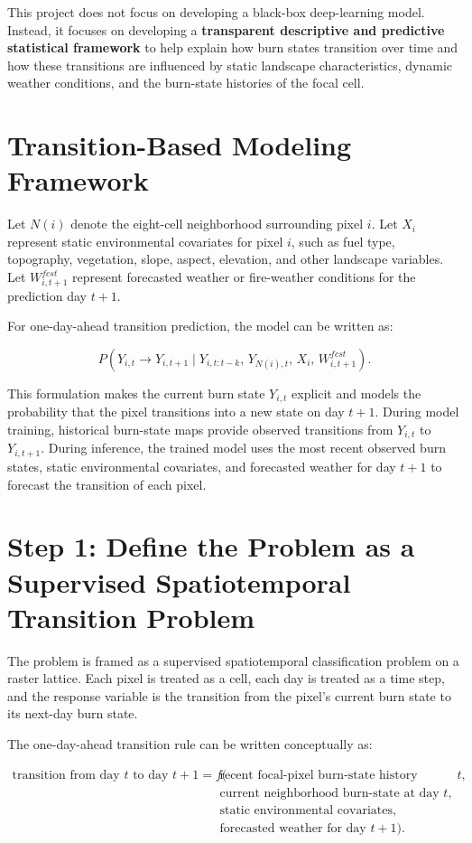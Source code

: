\documentclass[11pt]{article}
\begin{document}
This project does not focus on developing a black-box deep-learning model. Instead, it focuses on developing a \textbf{transparent descriptive and predictive statistical framework} to help explain how burn states transition over time and how these transitions are influenced by static landscape characteristics, dynamic weather conditions, and the burn-state histories of the focal cell.

\section{Transition-Based Modeling Framework}

Let $N(i)$ denote the eight-cell neighborhood surrounding pixel $i$. Let $X_i$ represent static environmental covariates for pixel $i$, such as fuel type, topography, vegetation, slope, aspect, elevation, and other landscape variables. Let $W^{fcst}_{i,t+1}$ represent forecasted weather or fire-weather conditions for the prediction day $t+1$.

For one-day-ahead transition prediction, the model can be written as:

\[
P\left(
Y_{i,t} \rightarrow Y_{i,t+1}
\mid
Y_{i,t:t-k},\,
Y_{N(i),t},\,
X_i,\,
W^{fcst}_{i,t+1}
\right).
\]

This formulation makes the current burn state $Y_{i,t}$ explicit and models the probability that the pixel transitions into a new state on day $t+1$. During model training, historical burn-state maps provide observed transitions from $Y_{i,t}$ to $Y_{i,t+1}$. During inference, the trained model uses the most recent observed burn states, static environmental covariates, and forecasted weather for day $t+1$ to forecast the transition of each pixel.

\section{Step 1: Define the Problem as a Supervised Spatiotemporal Transition Problem}

The problem is framed as a supervised spatiotemporal classification problem on a raster lattice. Each pixel is treated as a cell, each day is treated as a time step, and the response variable is the transition from the pixel's current burn state to its next-day burn state.

The one-day-ahead transition rule can be written conceptually as:

\[
\begin{aligned}
\text{transition from day } t \text{ to day } t+1 =
f(&\text{recent focal-pixel burn-state history through day } t,\\
  &\text{current neighborhood burn-state at day } t,\\
  &\text{static environmental covariates},\\
  &\text{forecasted weather for day } t+1).
\end{aligned}
\]
\end{document}
